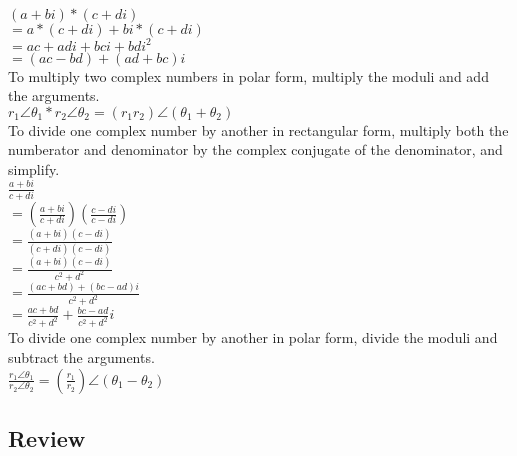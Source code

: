 \tab$(a + bi) * (c + di)$\\

\tab$= a * (c + di) + bi * (c + di)$\\

\tab$= ac + adi + bci + bdi^2$\\

\tab$= (ac - bd) + (ad + bc)i$\\

To multiply two complex numbers in polar form, multiply the moduli and add the arguments.\\

\tab$r_1\angle\theta_1 * r_2\angle\theta_2 = (r_1r_2)\angle(\theta_1+\theta_2)$\\

To divide one complex number by another in rectangular form, multiply both the numberator and denominator by the complex conjugate of the denominator, and simplify.\\

\tab$\frac{a+bi}{c+di}$\\

\tab$= (\frac{a+bi}{c+di})(\frac{c-di}{c-di})$\\

\tab$= \frac{(a+bi)(c-di)}{(c+di)(c-di)}$\\

\tab$= \frac{(a+bi)(c-di)}{c^2+d^2}$\\

\tab$= \frac{(ac+bd) + (bc-ad)i}{c^2+d^2}$\\

\tab$= \frac{ac+bd}{c^2+d^2} + \frac{bc-ad}{c^2+d^2}i$\\

To divide one complex number by another in polar form, divide the moduli and subtract the arguments.\\

\tab$\frac{r_1\angle\theta_1}{r_2\angle\theta_2} = (\frac{r_1}{r_2})\angle(\theta_1 - \theta_2)$ \\

\subsection{Review}

